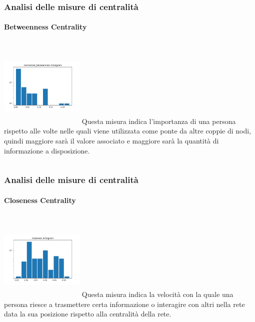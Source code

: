 \documentclass[hyperref={pdfpagelabels=false}]{beamer}
\begin{document}

\begin{frame}
\frametitle{Analisi delle misure di centralità}
\framesubtitle{Betweenness Centrality}
\begin{columns}
             \centering
             \includegraphics[height=4cm, 
             width=4cm]{images/centrality_measures/normalized_betweenness.pdf}
              Questa misura indica l'importanza di una persona rispetto alle volte nelle quali viene utilizzata come ponte da altre coppie di nodi, quindi maggiore sarà il valore associato e maggiore sarà la quantità di informazione a disposizione. 
         \end{columns} 

\end{frame}


\begin{frame}
\frametitle{Analisi delle misure di centralità}
\framesubtitle{Closeness Centrality}
\begin{columns}
             \centering
             \includegraphics[height=4cm, 
             width=4cm]{images/centrality_measures/closeness.pdf}
             Questa misura indica la velocità con la quale una persona riesce a trasmettere certa informazione o interagire con altri nella rete data la sua posizione rispetto alla centralità della rete. 
         \end{columns} 

\end{frame}
\end{document}
